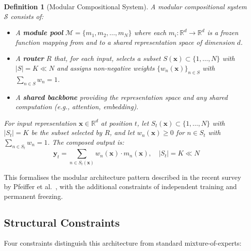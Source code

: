 \documentclass[11pt,a4paper]{article}
\newtheorem{definition}{Definition}
\begin{document}
\begin{definition}[Modular Compositional System]
A modular compositional system $\mathcal{S}$ consists of:
\begin{itemize}[nosep]
  \item A \textbf{module pool} $\mathcal{M} = \{m_1, m_2, \ldots, m_N\}$ where each $m_i : \mathbb{R}^d \to \mathbb{R}^d$ is a frozen function mapping from and to a shared representation space of dimension $d$.
  \item A \textbf{router} $R$ that, for each input, selects a subset $S(\mathbf{x}) \subset \{1,\ldots,N\}$ with $|S| = K \ll N$ and assigns non-negative weights $\{w_n(\mathbf{x})\}_{n \in S}$ with $\sum_{n \in S} w_n = 1$.
  \item A \textbf{shared backbone} providing the representation space and any shared computation (e.g., attention, embedding).
\end{itemize}
For input representation $\mathbf{x} \in \mathbb{R}^d$ at position $t$, let $S_t(\mathbf{x}) \subset \{1,\ldots,N\}$ with $|S_t| = K$ be the subset selected by $R$, and let $w_n(\mathbf{x}) \geq 0$ for $n \in S_t$ with $\sum_{n \in S_t} w_n = 1$. The composed output is:
\begin{equation}
\label{eq:composition}
\mathbf{y}_t = \sum_{n \in S_t(\mathbf{x})} w_n(\mathbf{x}) \cdot m_n(\mathbf{x}), \quad |S_t| = K \ll N
\end{equation}
\end{definition}

\noindent This formalises the modular architecture pattern described in the recent survey by Pfeiffer et al.~\cite{pfeiffer2023modular}, with the additional constraints of independent training and permanent freezing.

\subsection{Structural Constraints}

Four constraints distinguish this architecture from standard mixture-of-experts:
\end{document}
